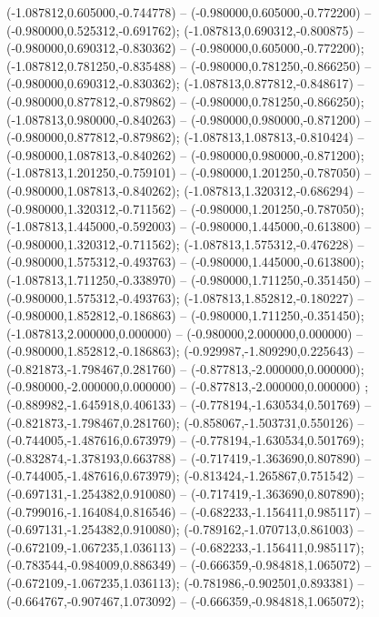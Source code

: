  (-1.087812,0.605000,-0.744778) -- (-0.980000,0.605000,-0.772200) -- (-0.980000,0.525312,-0.691762);
 (-1.087813,0.690312,-0.800875) -- (-0.980000,0.690312,-0.830362) -- (-0.980000,0.605000,-0.772200);
 (-1.087812,0.781250,-0.835488) -- (-0.980000,0.781250,-0.866250) -- (-0.980000,0.690312,-0.830362);
 (-1.087813,0.877812,-0.848617) -- (-0.980000,0.877812,-0.879862) -- (-0.980000,0.781250,-0.866250);
 (-1.087813,0.980000,-0.840263) -- (-0.980000,0.980000,-0.871200) -- (-0.980000,0.877812,-0.879862);
 (-1.087813,1.087813,-0.810424) -- (-0.980000,1.087813,-0.840262) -- (-0.980000,0.980000,-0.871200);
 (-1.087813,1.201250,-0.759101) -- (-0.980000,1.201250,-0.787050) -- (-0.980000,1.087813,-0.840262);
 (-1.087813,1.320312,-0.686294) -- (-0.980000,1.320312,-0.711562) -- (-0.980000,1.201250,-0.787050);
 (-1.087813,1.445000,-0.592003) -- (-0.980000,1.445000,-0.613800) -- (-0.980000,1.320312,-0.711562);
 (-1.087813,1.575312,-0.476228) -- (-0.980000,1.575312,-0.493763) -- (-0.980000,1.445000,-0.613800);
 (-1.087813,1.711250,-0.338970) -- (-0.980000,1.711250,-0.351450) -- (-0.980000,1.575312,-0.493763);
 (-1.087813,1.852812,-0.180227) -- (-0.980000,1.852812,-0.186863) -- (-0.980000,1.711250,-0.351450);
 (-1.087813,2.000000,0.000000) -- (-0.980000,2.000000,0.000000) -- (-0.980000,1.852812,-0.186863);
 (-0.929987,-1.809290,0.225643) -- (-0.821873,-1.798467,0.281760) -- (-0.877813,-2.000000,0.000000);
 (-0.980000,-2.000000,0.000000) -- (-0.877813,-2.000000,0.000000) ;
 (-0.889982,-1.645918,0.406133) -- (-0.778194,-1.630534,0.501769) -- (-0.821873,-1.798467,0.281760);
 (-0.858067,-1.503731,0.550126) -- (-0.744005,-1.487616,0.673979) -- (-0.778194,-1.630534,0.501769);
 (-0.832874,-1.378193,0.663788) -- (-0.717419,-1.363690,0.807890) -- (-0.744005,-1.487616,0.673979);
 (-0.813424,-1.265867,0.751542) -- (-0.697131,-1.254382,0.910080) -- (-0.717419,-1.363690,0.807890);
 (-0.799016,-1.164084,0.816546) -- (-0.682233,-1.156411,0.985117) -- (-0.697131,-1.254382,0.910080);
 (-0.789162,-1.070713,0.861003) -- (-0.672109,-1.067235,1.036113) -- (-0.682233,-1.156411,0.985117);
 (-0.783544,-0.984009,0.886349) -- (-0.666359,-0.984818,1.065072) -- (-0.672109,-1.067235,1.036113);
 (-0.781986,-0.902501,0.893381) -- (-0.664767,-0.907467,1.073092) -- (-0.666359,-0.984818,1.065072);
